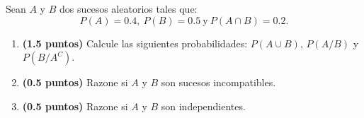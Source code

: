 
Sean $A$ y $B$ dos sucesos aleatorios tales que:
\[
P(A)=0.4,\ P(B)=0.5\ \text{y}\ P(A\cap B)=0.2.
\]
\begin{enumerate}[label=\alph*)]
\item \textbf{(1.5 puntos)} Calcule las siguientes probabilidades: $P(A\cup B)$, $P(A/B)$ y $P(B/A^C)$.
\item \textbf{(0.5 puntos)} Razone si $A$ y $B$ son sucesos incompatibles.
\item \textbf{(0.5 puntos)} Razone si $A$ y $B$ son independientes.
\end{enumerate}
